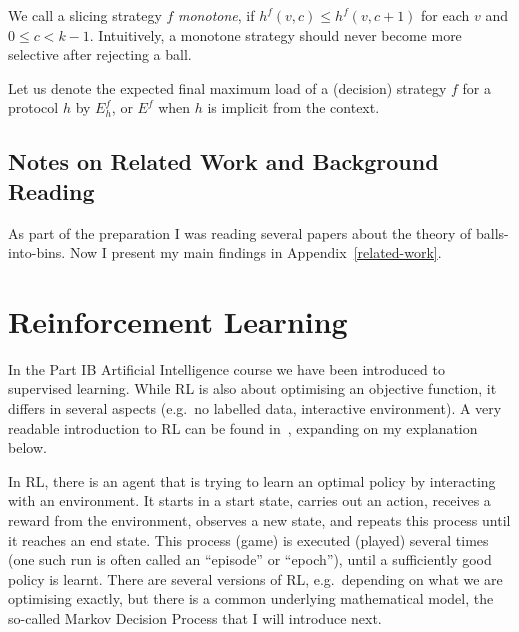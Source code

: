 \begin{definition} 
We call a \KThinning slicing strategy $f$ \textit{monotone}, if $h^f(v,c)\leq h^f(v,c+1)$ for each $v$ and $0\leq c<k-1$. Intuitively, a monotone strategy should never become more selective after rejecting a ball.
\end{definition}


\begin{definition} 
Let us denote the expected final maximum load of a (decision) strategy $f$ for a protocol $h$ by $E^f_h$, or $E^f$ when $h$ is implicit from the context.
\end{definition}



\subsection{Notes on Related Work and Background Reading}

As part of the preparation I was reading several papers about the theory of balls-into-bins. Now I present my main findings in Appendix~\ref{related-work}.



\section{Reinforcement Learning} \label{RLintro}


In the Part IB Artificial Intelligence course we have been introduced to supervised learning. While RL is also about optimising an objective function, it differs in several aspects (e.g.\ no labelled data, interactive environment). A very readable introduction to RL can be found in~\cite{sutton2018RLbook}, expanding on my explanation below.


In RL, there is an agent that is trying to learn an optimal policy by interacting with an environment. It starts in a start state, carries out an action, receives a reward from the environment, observes a new state, and repeats this process until it reaches an end state. This process (game) is executed (played) several times (one such run is often called an ``episode'' or ``epoch''), until a sufficiently good policy is learnt. There are several versions of RL, e.g.\ depending on what we are optimising exactly, but there is a common underlying mathematical model, the so-called Markov Decision Process that I will introduce next.

